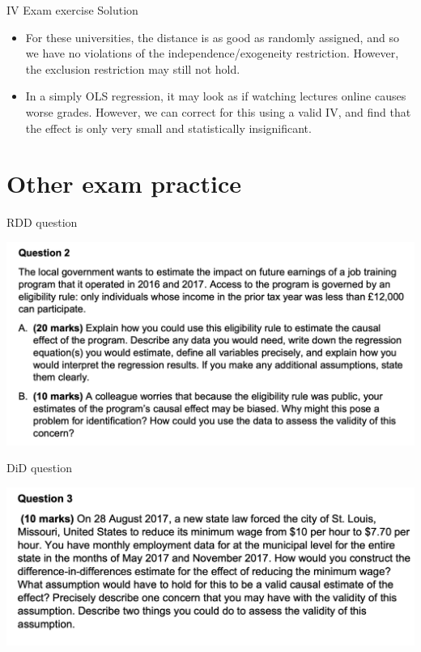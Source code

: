 \documentclass[11pt,xcolor=table]{beamer}
\begin{document}
\begin{frame}[allowframebreaks]{IV Exam exercise}
\framebreak 
\alert{Solution}
\begin{itemize}
    \item For these universities, the distance is as good as randomly assigned, and so we have no violations of the independence/exogeneity restriction. However, the exclusion restriction may still not hold.
    \item In a simply OLS regression, it may look as if watching lectures online causes worse grades. However, we can correct for this using a valid IV, and find that the effect is only very small and statistically insignificant.
\end{itemize}


\end{frame}





\section{Other exam practice}

\begin{frame}{RDD question}

    \includegraphics[width=1.0\textwidth]{figures/q_rdd_1.png}
\end{frame}



\begin{frame}{DiD question}

    \includegraphics[width=1.0\textwidth]{figures/q_did.png}
\end{frame}
\end{document}
